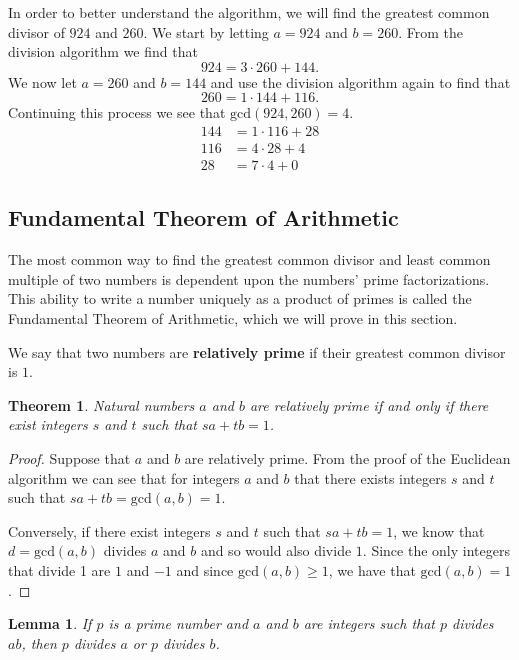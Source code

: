 \documentclass[
]{book}
\newtheorem{theorem}{Theorem}[chapter]
\newtheorem{lemma}{Lemma}[chapter]
\theoremstyle{definition}
\theoremstyle{definition}
\theoremstyle{definition}
\theoremstyle{definition}
\theoremstyle{remark}
\begin{document}
In order to better understand the algorithm, we will find the greatest common divisor of \(924\) and \(260\). We start by letting \(a=924\) and \(b=260\). From the division algorithm we find that
\[924 = 3 \cdot 260+144.\] We now let \(a=260\) and \(b=144\) and use the division algorithm again to find that \[260=1\cdot 144 + 116.\] Continuing this process we see that \(\mathrm{gcd}(924,260)=4\).
\begin{align*}
144 &=1\cdot 116 + 28 \\
116 &= 4 \cdot 28 + 4 \\
28 &= 7\cdot 4 + 0 
\end{align*}

\hypertarget{fundamental-theorem-of-arithmetic}{%
\subsection{Fundamental Theorem of Arithmetic}\label{fundamental-theorem-of-arithmetic}}

The most common way to find the greatest common divisor and least common multiple of two numbers is dependent upon the numbers' prime factorizations. This ability to write a number uniquely as a product of primes is called the Fundamental Theorem of Arithmetic, which we will prove in this section.

We say that two numbers are \textbf{relatively prime} if their greatest common divisor is \(1\).

\begin{theorem}
\protect\hypertarget{thm:relatively-prime}{}\label{thm:relatively-prime}Natural numbers \(a\) and \(b\) are relatively prime if and only if there exist integers \(s\) and \(t\) such that \(sa+tb=1\).
\end{theorem}

\begin{proof}
Suppose that \(a\) and \(b\) are relatively prime. From the proof of the Euclidean algorithm we can see that for integers \(a\) and \(b\) that there exists integers \(s\) and \(t\) such that \(sa+tb=\mathrm{gcd}(a,b)=1\).

Conversely, if there exist integers \(s\) and \(t\) such that \(sa+tb=1\), we know that \(d=\mathrm{gcd}(a,b)\) divides \(a\) and \(b\) and so would also divide \(1\). Since the only integers that divide 1 are \(1\) and \(-1\) and since \(\mathrm{gcd}(a,b)\geq 1\), we have that \(\mathrm{gcd}(a,b)=1\).
\end{proof}

\begin{lemma}
\protect\hypertarget{lem:prime-lemma}{}\label{lem:prime-lemma}If \(p\) is a prime number and \(a\) and \(b\) are integers such that \(p\) divides \(ab\), then \(p\) divides \(a\) or \(p\) divides \(b\).
\end{lemma}
\end{document}
